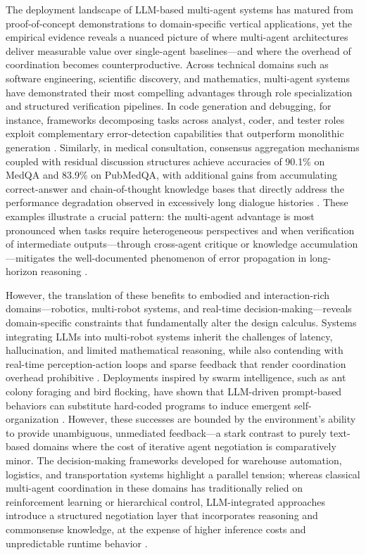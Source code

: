 \documentclass[11pt,a4paper]{article}
\begin{document}
The deployment landscape of LLM-based multi-agent systems has matured from proof-of-concept demonstrations to domain-specific vertical applications, yet the empirical evidence reveals a nuanced picture of where multi-agent architectures deliver measurable value over single-agent baselines---and where the overhead of coordination becomes counterproductive. Across technical domains such as software engineering, scientific discovery, and mathematics, multi-agent systems have demonstrated their most compelling advantages through role specialization and structured verification pipelines. In code generation and debugging, for instance, frameworks decomposing tasks across analyst, coder, and tester roles exploit complementary error-detection capabilities that outperform monolithic generation \cite{arxiv:2501.06322v1,arxiv:2306.03314v1}. Similarly, in medical consultation, consensus aggregation mechanisms coupled with residual discussion structures achieve accuracies of 90.1\% on MedQA and 83.9\% on PubMedQA, with additional gains from accumulating correct-answer and chain-of-thought knowledge bases that directly address the performance degradation observed in excessively long dialogue histories \cite{arxiv:2503.13856v1}. These examples illustrate a crucial pattern: the multi-agent advantage is most pronounced when tasks require heterogeneous perspectives and when verification of intermediate outputs---through cross-agent critique or knowledge accumulation---mitigates the well-documented phenomenon of error propagation in long-horizon reasoning \cite{arxiv:2501.06322v1,arxiv:2306.03314v1}.

However, the translation of these benefits to embodied and interaction-rich domains---robotics, multi-robot systems, and real-time decision-making---reveals domain-specific constraints that fundamentally alter the design calculus. Systems integrating LLMs into multi-robot systems inherit the challenges of latency, hallucination, and limited mathematical reasoning, while also contending with real-time perception-action loops and sparse feedback that render coordination overhead prohibitive \cite{arxiv:2502.03814v5,arxiv:2502.14743v2}. Deployments inspired by swarm intelligence, such as ant colony foraging and bird flocking, have shown that LLM-driven prompt-based behaviors can substitute hard-coded programs to induce emergent self-organization \cite{arxiv:2503.03800v1}. However, these successes are bounded by the environment's ability to provide unambiguous, unmediated feedback---a stark contrast to purely text-based domains where the cost of iterative agent negotiation is comparatively minor. The decision-making frameworks developed for warehouse automation, logistics, and transportation systems highlight a parallel tension; whereas classical multi-agent coordination in these domains has traditionally relied on reinforcement learning or hierarchical control, LLM-integrated approaches introduce a structured negotiation layer that incorporates reasoning and commonsense knowledge, at the expense of higher inference costs and unpredictable runtime behavior \cite{arxiv:2503.13415v1}.
\end{document}
